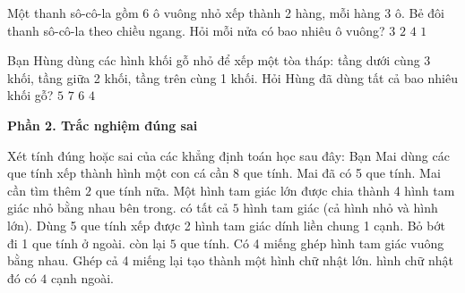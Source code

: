 \begin{ex} %
Một thanh sô-cô-la gồm 6 ô vuông nhỏ xếp thành 2 hàng, mỗi hàng 3 ô. Bẻ đôi thanh sô-cô-la theo chiều ngang. Hỏi mỗi nửa có bao nhiêu ô vuông?
\choice
{\True $3$}
{$2$}
{$4$}
{$1$}
\end{ex}

\begin{ex} %
Bạn Hùng dùng các hình khối gỗ nhỏ để xếp một tòa tháp: tầng dưới cùng 3 khối, tầng giữa 2 khối, tầng trên cùng 1 khối. Hỏi Hùng đã dùng tất cả bao nhiêu khối gỗ?
\choice
{$5$}
{$7$}
{\True $6$}
{$4$}
\end{ex}

\textbf{Phần 2. Trắc nghiệm đúng sai}

\begin{ex} %
Xét tính đúng hoặc sai của các khẳng định toán học sau đây:
\choiceTF
{Bạn Mai dùng các que tính xếp thành hình một con cá cần 8 que tính. Mai đã có 5 que tính. Mai cần tìm thêm $2$ que tính nữa.}
{\True Một hình tam giác lớn được chia thành 4 hình tam giác nhỏ bằng nhau bên trong. có tất cả $5$ hình tam giác (cả hình nhỏ và hình lớn).}
{Dùng 5 que tính xếp được 2 hình tam giác dính liền chung 1 cạnh. Bỏ bớt đi 1 que tính ở ngoài. còn lại $5$ que tính.}
{\True Có 4 miếng ghép hình tam giác vuông bằng nhau. Ghép cả 4 miếng lại tạo thành một hình chữ nhật lớn. hình chữ nhật đó có $4$ cạnh ngoài.}
\end{ex}

